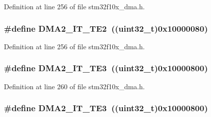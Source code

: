 Definition at line 256 of file stm32f10x\+\_\+dma.\+h.

\subsubsection[{\texorpdfstring{D\+M\+A2\+\_\+\+I\+T\+\_\+\+T\+E2}{DMA2_IT_TE2}}]{\setlength{\rightskip}{0pt plus 5cm}\#define D\+M\+A2\+\_\+\+I\+T\+\_\+\+T\+E2~(({\bf uint32\+\_\+t})0x10000080)}\hypertarget{group___d_m_a__interrupts__definition_ga5f32004b492a225495c9c1dcd5002042}{}\label{group___d_m_a__interrupts__definition_ga5f32004b492a225495c9c1dcd5002042}


Definition at line 256 of file stm32f10x\+\_\+dma.\+h.

\subsubsection[{\texorpdfstring{D\+M\+A2\+\_\+\+I\+T\+\_\+\+T\+E3}{DMA2_IT_TE3}}]{\setlength{\rightskip}{0pt plus 5cm}\#define D\+M\+A2\+\_\+\+I\+T\+\_\+\+T\+E3~(({\bf uint32\+\_\+t})0x10000800)}\hypertarget{group___d_m_a__interrupts__definition_ga2fd4ce5d7e2d67c05379f826ae1b1da6}{}\label{group___d_m_a__interrupts__definition_ga2fd4ce5d7e2d67c05379f826ae1b1da6}


Definition at line 260 of file stm32f10x\+\_\+dma.\+h.

\subsubsection[{\texorpdfstring{D\+M\+A2\+\_\+\+I\+T\+\_\+\+T\+E3}{DMA2_IT_TE3}}]{\setlength{\rightskip}{0pt plus 5cm}\#define D\+M\+A2\+\_\+\+I\+T\+\_\+\+T\+E3~(({\bf uint32\+\_\+t})0x10000800)}\hypertarget{group___d_m_a__interrupts__definition_ga2fd4ce5d7e2d67c05379f826ae1b1da6}{}\label{group___d_m_a__interrupts__definition_ga2fd4ce5d7e2d67c05379f826ae1b1da6}


